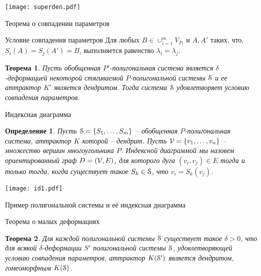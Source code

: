 \documentclass[aspectratio=1610, 10pt, notheorems]{beamer}
\newtheorem{theorem}     {Теорема}
\newtheorem{definition}  {Определение}
\begin{document}
\begin{frame}{}
\texttt{[image: superden.pdf]}
\end{frame}

\begin{frame}{Теорема о совпадении параметров}
\begin{block}{Условие совпадения параметров}
Для любых $B \in\cup_{i=1}^m  V_{P_i}$ и $A,A'$ таких, что, $S_i(A)=S_j(A')=B$, выполняется равенство $\lambda _i=\lambda _j$.
\end{block}
\begin{theorem}
Пусть обобщенная $P'$-полигональная система является $\delta$-деформацией некоторой стягиваемой $P$-полигональной системы ${\EuScript S}$ и ее аттрактор $K'$ является дендритом. Тогда система ${\EuScript S}$ удовлетворяет условию совпадения параметров.
\end{theorem}
\end{frame}

\begin{frame}{Индексная диаграмма}
\begin{definition}
Пусть ${\EuScript S}=\{S_1,\ldots,S_m\}$ -- обобщенная $P$-полигональная система, аттрактор $K$ которой -- дендрит. Пусть ${\mathcal V}=\{v_1,\ldots,v_n\}$ -- множество вершин многоугольника $P$. Индексной диаграммой мы назовем ориентированный граф $D=({\mathcal V},E)$, для которого дуга $(v_i,v_j)\in E$ тогда и только тогда, когда существует такое $S_k\in{\EuScript S}$, что $v_i=S_k(v_j)$. 
\end{definition}

\texttt{[image: id1.pdf]}

\end{frame}

\begin{frame}{Пример полигональной системы и её индексная диаграмма}
\end{frame}


\begin{frame}{Теорема о малых деформациях}
\begin{theorem}
Для каждой полигональной системы ${\EuScript S}$ существует такое $\delta > 0$, что для всякой $\delta$-деформации $S'$ полигональной системы ${\EuScript S}$, удовлетворяющей условию совпадения параметров, аттрактор $K({\EuScript S}')$ является дендритом, гомеоморфным $K({\EuScript S})$.
\end{theorem}
\end{frame}
\end{document}
